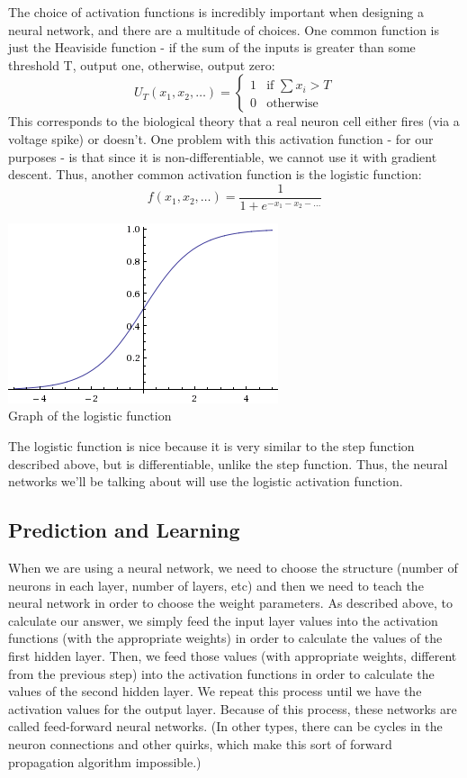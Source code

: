 \documentclass{article}
\begin{document}
The choice of activation functions is incredibly important when designing a neural network, and
there are a multitude of choices. One common function is just the Heaviside function - if the sum of
the inputs is greater than some threshold T, output one, otherwise, output zero: 
\[U_T(x_1,x_2,\ldots) = \left\{ \begin{array}{lr} 1 & \text{if } \sum x_i > T\\ 0 & \text{otherwise} \end{array} \right. \] 
This corresponds to the biological theory that a real neuron cell either fires (via a voltage
spike) or doesn't. One problem with this activation function - for our purposes - is that since
it is non-differentiable, we cannot use it with gradient descent. Thus, another common
activation function is the logistic function: 
\[f(x_1, x_2, \ldots) = \frac{1}{1 + e^{-x_1-x_2-\ldots}}\]

\begin{center}
    \includegraphics[scale=0.5]{images/logistic.png} \\
    Graph of the logistic function
\end{center}

The logistic function is nice because it is very similar to the step function described above, but
is differentiable, unlike the step function. Thus, the neural networks we'll be talking about will
use the logistic activation function.

\subsection*{Prediction and Learning}

When we are using a neural network, we need to choose the structure (number of neurons in each
layer, number of layers, etc) and then we need to teach the neural network in order to choose the
weight parameters. As described above, to calculate our answer, we simply feed the input layer
values into the activation functions (with the appropriate weights) in order to calculate the values
of the first hidden layer. Then, we feed those values (with appropriate weights, different from the
previous step) into the activation functions in order to calculate the values of the second hidden
layer. We repeat this process until we have the activation values for the output layer. Because of
this process, these networks are called feed-forward neural networks. (In other types, there can be
cycles in the neuron connections and other quirks, which make this sort of forward propagation
algorithm impossible.)
\end{document}
